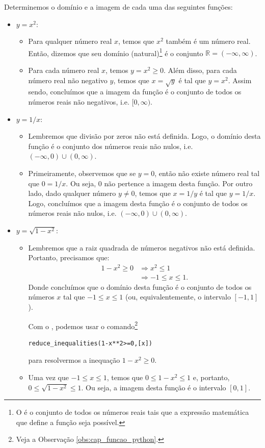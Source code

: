 \begin{ex}
  Determinemos o domínio e a imagem de cada uma das seguintes funções:
  \begin{itemize}
  \item $y=x^2$:
    \begin{itemize}
    \item Para qualquer número real $x$, temos que $x^2$ também é um número real. Então, dizemos que seu domínio (natural)\footnote{O  é o conjunto de todos os números reais tais que a expressão matemática que define a função seja possível.} é o conjunto $\mathbb{R} = (-\infty, \infty)$.
    \item Para cada número real $x$, temos $y=x^2\geq0$. Além disso, para cada número real não negativo $y$, temos que $x=\sqrt{y}$ é tal que $y=x^2$. Assim sendo, concluímos que a imagem da função é o conjunto de todos os números reais não negativos, i.e. $[0, \infty)$.
    \end{itemize}
  \item $y=1/x$:
    \begin{itemize}
    \item Lembremos que divisão por zeros não está definida. Logo, o domínio desta função é o conjunto dos números reais não nulos, i.e. $(-\infty, 0)\cup (0, \infty)$.
    \item Primeiramente, observemos que se $y=0$, então não existe número real tal que $0=1/x$. Ou seja, $0$ não pertence a imagem desta função. Por outro lado, dado qualquer número $y\neq 0$, temos que $x=1/y$ é tal que $y=1/x$. Logo, concluímos que a imagem desta função é o conjunto de todos os números reais não nulos, i.e. $(-\infty, 0)\cup (0, \infty)$.
    \end{itemize}
  \item $y=\sqrt{1-x^2}$:
    \begin{itemize}
    \item Lembremos que a raiz quadrada de números negativos não está definida. Portanto, precisamos que:
      \begin{align}
        1-x^2\geq 0 &\Rightarrow x^2 \leq 1\\
                    &\Rightarrow -1 \leq x \leq 1.
      \end{align}
      Donde concluímos que o domínio desta função é o conjunto de todos os números $x$ tal que $-1\leq x \leq 1$ (ou, equivalentemente, o intervalo $[-1, 1]$).
      
      \ifispython
      Com o \sympy, podemos usar o comando\footnote{Veja a Observação \ref{obs:cap_funcao_python}.}
\begin{verbatim}
reduce_inequalities(1-x**2>=0,[x])
\end{verbatim}
      para resolvermos a inequação $1-x^2\geq 0$.
      \fi
    \item Uma vez que $-1 \leq x \leq 1$, temos que $0 \leq 1-x^2 \leq 1$ e, portanto, $0\leq \sqrt{1-x^2} \leq 1$. Ou seja, a imagem desta função é o intervalo $[0, 1]$.
    \end{itemize}
  \end{itemize}
\end{ex}

